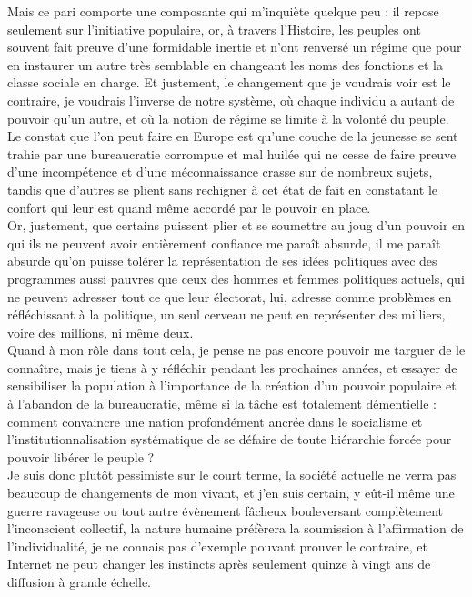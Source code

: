 \documentclass[12pt,a4paper]{article}
\begin{document}
{Mais ce pari comporte une composante qui m'inquiète quelque peu : il repose seulement sur l'initiative populaire, or, à travers l'Histoire, les peuples ont souvent fait preuve d'une formidable inertie et n'ont renversé un régime que pour en instaurer un autre très semblable en changeant les noms des fonctions et la classe sociale en charge. Et justement, le changement que je voudrais voir est le contraire, je voudrais l'inverse de notre système, où chaque individu a autant de pouvoir qu'un autre, et où la notion de régime se limite à la volonté du peuple. Le constat que l'on peut faire en Europe est qu'une couche de la jeunesse se sent trahie par une bureaucratie corrompue et mal huilée qui ne cesse de faire preuve d'une incompétence et d'une méconnaissance crasse sur de nombreux sujets, tandis que d'autres se plient sans rechigner à cet état de fait en constatant le confort qui leur est quand même accordé par le pouvoir en place.\\

Or, justement, que certains puissent plier et se soumettre au joug d'un pouvoir en qui ils ne peuvent avoir entièrement confiance me paraît absurde, il me paraît absurde qu'on puisse tolérer la représentation de ses idées politiques avec des programmes aussi pauvres que ceux des hommes et femmes politiques actuels, qui ne peuvent adresser tout ce que leur électorat, lui, adresse comme problèmes en réfléchissant à la politique, un seul cerveau ne peut en représenter des milliers, voire des millions, ni même deux.\\

Quand à mon rôle dans tout cela, je pense ne pas encore pouvoir me targuer de le connaître, mais je tiens à y réfléchir pendant les prochaines années, et essayer de sensibiliser la population à l'importance de la création d'un pouvoir populaire et à l'abandon de la bureaucratie, même si la tâche est totalement démentielle : comment convaincre une nation profondément ancrée dans le socialisme et l'institutionnalisation systématique de se défaire de toute hiérarchie forcée pour pouvoir libérer le peuple ?\\

Je suis donc plutôt pessimiste sur le court terme, la société actuelle ne verra pas beaucoup de changements de mon vivant, et j'en suis certain, y eût-il même une guerre ravageuse ou tout autre évènement fâcheux bouleversant complètement l'inconscient collectif, la nature humaine préfèrera la soumission à l'affirmation de l'individualité, je ne connais pas d'exemple pouvant prouver le contraire, et Internet ne peut changer les instincts après seulement quinze à vingt ans de diffusion à grande échelle.\\

}
\end{document}
